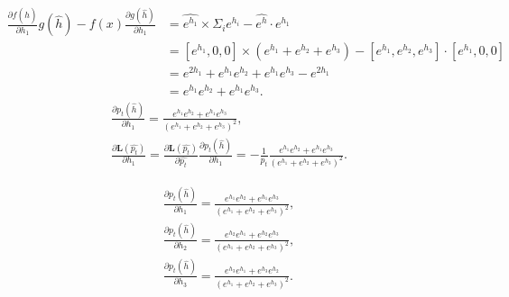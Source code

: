\documentclass[10pt]{beamer}
\newcommand{\dghf}{\frac{\partial g(\hat{h})}{\partial h_{1}}}
\newcommand{\dfhf}{\frac{\partial f(\hat{h})}{\partial h_{1}}}
\begin{document}
\begin{frame}
    \begin{align*}
        \dfhf g(\hat{h}) - f(x) \dghf &= \hat{e^{h_{1}}}\times \Sigma_{i}e^{h_{i}} - \hat{e^{h}}\cdot e^{h_{1}}\\
        &= [e^{h_{1}}, 0, 0]\times(e^{h_{1}}+e^{h_{2}}+e^{h_{3}}) -
        [e^{h_{1}}, e^{h_{2}}, e^{h_{3}}] \cdot [e^{h_{1}}, 0, 0]\\
        &= e^{2h_{1}} + e^{h_{1}}e^{h_{2}} + e^{h_{1}}e^{h_{3}} - e^{2h_{1}} \\
        &= e^{h_{1}}e^{h_{2}} + e^{h_{1}}e^{h_{3}}.
    \end{align*}
    \begin{align*}
        \frac{\partial p_{t}(\hat{h})}{\partial h_{1}} = 
        \frac{e^{h_{1}}e^{h_{2}} + e^{h_{1}}e^{h_{3}}}{(e^{h_{1}}+e^{h_{2}}+e^{h_{3}})^{2}},\\
        \frac{\partial \mathbf{L}(\hat{p_{t}})}{\partial h_{1}} = \frac{\partial \mathbf{L}(\hat{p_{t}})}{\partial \hat{p_{t}}}
        \frac{\partial p_{t}(\hat{h})}{\partial h_{1}} = -\frac{1}{p_{t}}
        \frac{e^{h_{1}}e^{h_{2}} + e^{h_{1}}e^{h_{3}}}{(e^{h_{1}}+e^{h_{2}}+e^{h_{3}})^{2}}.
    \end{align*}
\end{frame}

\begin{frame}
    \begin{align}
        \frac{\partial p_{t}(\hat{h})}{\partial h_{1}} = \frac{e^{h_{1}}e^{h_{2}} + e^{h_{1}}e^{h_{3}}}{(e^{h_{1}}+e^{h_{2}}+e^{h_{3}})^{2}},\\
        \frac{\partial p_{t}(\hat{h})}{\partial h_{2}} = \frac{e^{h_{2}}e^{h_{1}} + e^{h_{2}}e^{h_{3}}}{(e^{h_{1}}+e^{h_{2}}+e^{h_{3}})^{2}},\\
        \frac{\partial p_{t}(\hat{h})}{\partial h_{3}} = \frac{e^{h_{3}}e^{h_{1}} + e^{h_{3}}e^{h_{2}}}{(e^{h_{1}}+e^{h_{2}}+e^{h_{3}})^{2}}.
    \end{align}
\end{frame}
\end{document}
